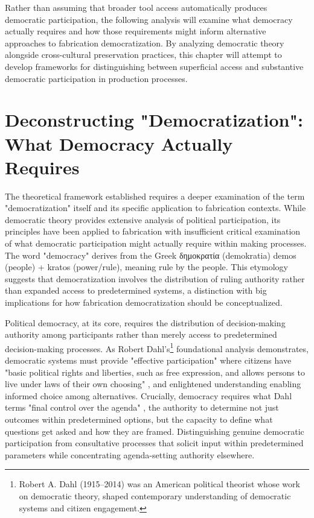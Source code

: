 \vspace{0.5cm} 

Rather than assuming that broader tool access automatically produces democratic participation, the following analysis will examine what democracy actually requires and how those requirements might inform alternative approaches to fabrication democratization. By analyzing democratic theory alongside cross-cultural preservation practices, this chapter will attempt to develop frameworks for distinguishing between superficial access and substantive democratic participation in production processes.

\section{Deconstructing "Democratization": What Democracy Actually Requires}

The theoretical framework established requires a deeper examination of the term "democratization" itself and its specific application to fabrication contexts. While democratic theory provides extensive analysis of political participation, its principles have been applied to fabrication with insufficient critical examination of what democratic participation might actually require within making processes. The word "democracy" derives from the Greek {\greekfont δημοκρατία} (demokratia) demos (people) + kratos (power/rule), meaning rule by the people. This etymology suggests that democratization involves the distribution of ruling authority rather than expanded access to predetermined systems, a distinction with big implications for how fabrication democratization should be conceptualized.

\vspace{0.5cm}

Political democracy, at its core, requires the distribution of decision-making authority among participants rather than merely access to predetermined decision-making processes. As Robert Dahl's\footnote{Robert A. Dahl (1915--2014) was an American political theorist whose work on democratic theory, shaped contemporary understanding of democratic systems and citizen engagement.} foundational analysis demonstrates, democratic systems must provide "effective participation" \citep{coglianese1990} where citizens have "basic political rights and liberties, such as free expression, and allows persons to live under laws of their own choosing" \citep{coglianese1990}, and enlightened understanding enabling informed choice among alternatives. Crucially, democracy requires what Dahl terms "final control over the agenda" \citep{mayhew2017}, the authority to determine not just outcomes within predetermined options, but the capacity to define what questions get asked and how they are framed. Distinguishing genuine democratic participation from consultative processes that solicit input within predetermined parameters while concentrating agenda-setting authority elsewhere.

